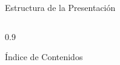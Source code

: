 \documentclass[aspectratio=169]{beamer}
\begin{document}
\begin{frame}{Estructura de la Presentación}
    \begin{columns}[T]
        \begin{column}{0.9\textwidth}
            \begin{block}{Índice de Contenidos}
                \tableofcontents[hideallsubsections]
            \end{block}
        \end{column}
    \end{columns}
\end{frame}

\end{document}
